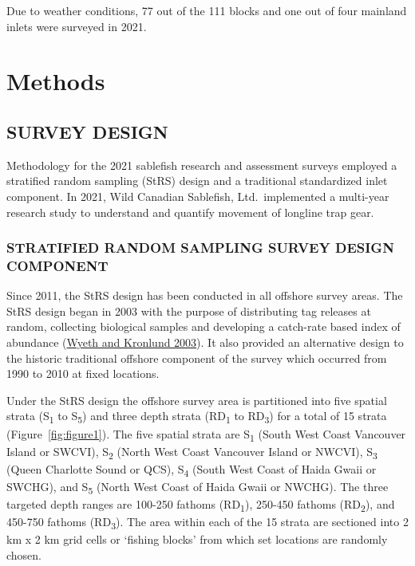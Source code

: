 \documentclass[12pt]{article}\usepackage[]{graphicx}\usepackage[]{color}
\begin{document}
Due to weather conditions, 77 out of the 111 blocks and one out of four mainland inlets were surveyed in 2021.\\
\clearpage

\hypertarget{methods}{%
\section{Methods}\label{methods}}

\hypertarget{survey-design}{%
\subsection{SURVEY DESIGN}\label{survey-design}}

Methodology for the 2021 sablefish research and assessment surveys employed a stratified random sampling (StRS) design and a traditional standardized inlet component. In 2021, Wild Canadian Sablefish, Ltd.~implemented a multi-year research study to understand and quantify movement of longline trap gear.

\hypertarget{stratified-random-sampling-survey-design-component}{%
\subsubsection{STRATIFIED RANDOM SAMPLING SURVEY DESIGN COMPONENT}\label{stratified-random-sampling-survey-design-component}}

Since 2011, the StRS design has been conducted in all offshore survey areas. The StRS design began in 2003 with the purpose of distributing tag releases at random, collecting biological samples and developing a catch-rate based index of abundance (\protect\hyperlink{ref-Wyeth2003}{Wyeth and Kronlund 2003}). It also provided an alternative design to the historic traditional offshore component of the survey which occurred from 1990 to 2010 at fixed locations.

Under the StRS design the offshore survey area is partitioned into five spatial strata (S\textsubscript{1} to S\textsubscript{5}) and three depth strata (RD\textsubscript{1} to RD\textsubscript{3}) for a total of 15 strata (Figure~\ref{fig:figure1}). The five spatial strata are S\textsubscript{1} (South West Coast Vancouver Island or SWCVI), S\textsubscript{2} (North West Coast Vancouver Island or NWCVI), S\textsubscript{3} (Queen Charlotte Sound or QCS), S\textsubscript{4} (South West Coast of Haida Gwaii or SWCHG), and S\textsubscript{5} (North West Coast of Haida Gwaii or NWCHG). The three targeted depth ranges are 100-250 fathoms (RD\textsubscript{1}), 250-450 fathoms (RD\textsubscript{2}), and 450-750 fathoms (RD\textsubscript{3}). The area within each of the 15 strata are sectioned into 2 km x 2 km grid cells or `fishing blocks' from which set locations are randomly chosen.
\end{document}

